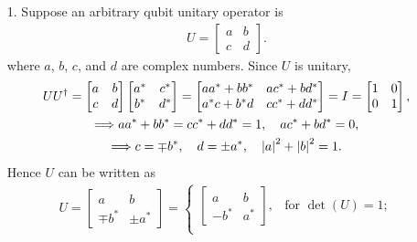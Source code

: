 \documentclass[en]{sol-man}
\begin{document}
\begin{sol}
    \begin{itemize}
        \item[1.] Suppose an arbitrary qubit unitary operator is
        \begin{align}
            U=\left[\begin{matrix}
                a&b\\
                c&d
            \end{matrix}\right].
        \end{align}
        where $a$, $b$, $c$, and $d$ are complex numbers. Since $U$ is unitary,
        \begin{gather}
            UU^{\dagger}=\left[\begin{matrix}
                a&b\\
                c&d
            \end{matrix}\right]\left[\begin{matrix}
                a^*&c^*\\
                b^*&d^*
            \end{matrix}\right]=\left[\begin{matrix}
                aa^*+bb^*&ac^*+bd^*\\
                a^*c+b^*d&cc^*+dd^*
            \end{matrix}\right]=I=\left[\begin{matrix}
                1&0\\
                0&1
            \end{matrix}\right],\\
            \Longrightarrow aa^*+bb^*=cc^*+dd^*=1,\quad ac^*+bd^*=0,\\
            \Longrightarrow c=\mp b^*,\quad d=\pm a^*,\quad\left\lvert a\right\rvert^2+\left\lvert b\right\rvert^2=1.
        \end{gather}
        Hence $U$ can be written as
        \begin{align}
            U=\left[\begin{matrix}
                a&b\\
                \mp b^*&\pm a^*
            \end{matrix}\right]=\left\{\begin{array}{ll}
                \left[\begin{matrix}
                    a&b\\
                    -b^*&a^*
                \end{matrix}\right],&\text{for }\det(U)=1;\\

\end{array}
\end{align}
\end{itemize}
\end{sol}
\end{document}
